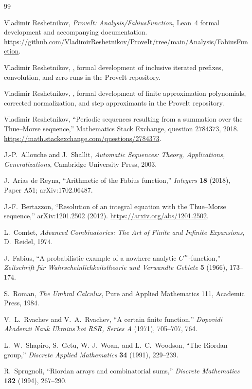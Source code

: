\documentclass[11pt,oneside]{article}
\numberwithin{equation}{section}
\theoremstyle{definition}
\theoremstyle{remark}
\begin{document}
\begin{thebibliography}{99}

Vladimir Reshetnikov, \emph{ProveIt: Analysis/FabiusFunction}, Lean~4
formal development and accompanying documentation.
\url{https://github.com/VladimirReshetnikov/ProveIt/tree/main/Analysis/FabiusFunction}.

Vladimir Reshetnikov, , formal
development of inclusive iterated prefixes, convolution, and zero runs in
the ProveIt repository.

Vladimir Reshetnikov, ,
formal development of finite approximation polynomials, corrected
normalization, and step approximants in the ProveIt repository.

Vladimir Reshetnikov, ``Periodic sequences resulting from a summation over
the Thue--Morse sequence,'' Mathematics Stack Exchange, question 2784373,
2018.
\url{https://math.stackexchange.com/questions/2784373}.

J.-P.~Allouche and J.~Shallit, \emph{Automatic Sequences: Theory,
Applications, Generalizations}, Cambridge University Press, 2003.

J.~Arias de Reyna, ``Arithmetic of the Fabius function,'' \emph{Integers}
\textbf{18} (2018), Paper A51; arXiv:1702.06487.

J.-F.~Bertazzon, ``Resolution of an integral equation with the Thue--Morse
sequence,'' arXiv:1201.2502 (2012).
\url{https://arxiv.org/abs/1201.2502}.

L.~Comtet, \emph{Advanced Combinatorics: The Art of Finite and Infinite
Expansions}, D.~Reidel, 1974.

J.~Fabius, ``A probabilistic example of a nowhere analytic
$C^\infty$-function,'' \emph{Zeitschrift f\"ur Wahrscheinlichkeitstheorie
und Verwandte Gebiete} \textbf{5} (1966), 173--174.

S.~Roman, \emph{The Umbral Calculus}, Pure and Applied Mathematics 111,
Academic Press, 1984.

V.~L.~Rvachev and V.~A.~Rvachev, ``A certain finite function,''
\emph{Dopovidi Akademii Nauk Ukrains'koi RSR, Series A} (1971), 705--707,
764.

L.~W.~Shapiro, S.~Getu, W.-J.~Woan, and L.~C.~Woodson, ``The Riordan
group,'' \emph{Discrete Applied Mathematics} \textbf{34} (1991), 229--239.

R.~Sprugnoli, ``Riordan arrays and combinatorial sums,'' \emph{Discrete
Mathematics} \textbf{132} (1994), 267--290.

\end{thebibliography}
\end{document}
